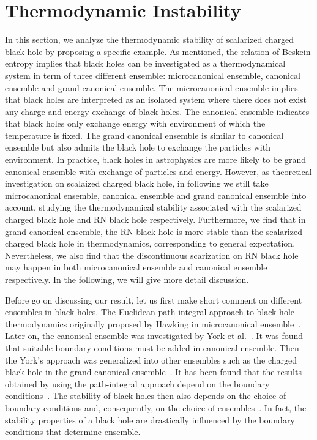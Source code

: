 \documentclass[pr, twocolumn, preprintnumbers, showpacs,footnoteadded, superscriptaddress,nofootinbib,longbibliography]{revtex4-1}
\begin{document}
\section{Thermodynamic Instability}\label{thermo}
In this section, we analyze the thermodynamic stability of scalarized charged black hole by proposing a specific example. As mentioned, the relation of Beskein entropy implies that black holes can be investigated as a thermodynamical system in term of three different ensemble: microcanonical ensemble, canonical ensemble and grand canonical ensemble. The microcanonical ensemble implies that black holes are interpreted as an isolated system where there does not exist any charge and energy exchange of black holes. The canonical ensemble indicates that black holes only exchange energy with environment of which the temperature is fixed. The grand canonical ensemble is similar to canonical ensemble but also admits the black hole to exchange the particles with environment. In practice, black holes in astrophysics are more likely to be grand canonical ensemble with exchange of particles and energy. However, as theoretical investigation on scalaized charged black hole, in following we still take microcanonical ensemble, canonical ensemble and grand canonical ensemble into account, studying the thermodynamical stability associated with the scalarized charged black hole and RN black hole respectively. Furthermore, we find that in grand canonical ensemble, the RN black hole is more stable than the scalarized charged black hole in thermodynamics, corresponding to general expectation. Nevertheless, we also find that the discontinuous scarization on RN black hole may happen in both microcanonical ensemble and canonical ensemble respectively. In the following, we will give more detail discussion.

Before go on discussing our result, let us first make short comment on different ensembles in black holes. The Euclidean path-integral approach to black hole thermodynamics originally proposed by Hawking in microcanonical ensemble~\cite{Hawking:1976de}. Later on, the canonical ensemble was investigated by York et al.~\cite{York:1986it,Whiting:1988qr,Brown:1994su}. It was found that suitable boundary conditions must be added in canonical ensemble. Then the York's approach was generalized into other ensembles such as the charged black hole in the grand canonical ensemble~\cite{PhysRevD.42.3376,Brown_1990}. It has been found that the results obtained by using the path-integral approach depend on the boundary conditions~\cite{Brown:1994gs,Hawking:1982dh}. The stability of black holes then also depends on the choice of boundary conditions and, consequently, on the choice of ensembles~\cite{Comer_1992}. In fact, the stability properties of a black hole are drastically influenced by the boundary conditions that determine ensemble.
\end{document}
